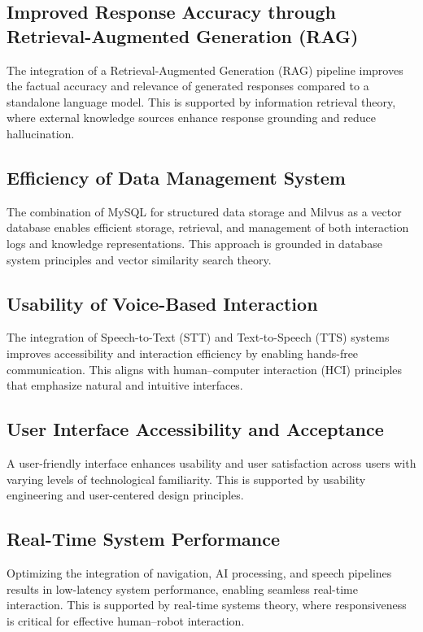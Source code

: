 \subsection{Improved Response Accuracy through Retrieval-Augmented Generation (RAG)} 
The integration of a Retrieval-Augmented Generation (RAG) pipeline improves the factual accuracy and relevance of generated responses compared to a standalone language model. This is supported by information retrieval theory, where external knowledge sources enhance response grounding and reduce hallucination.

\subsection{Efficiency of Data Management System}
The combination of MySQL for structured data storage and Milvus as a vector database enables efficient storage, retrieval, and management of both interaction logs and knowledge representations. This approach is grounded in database system principles and vector similarity search theory.

\subsection{Usability of Voice-Based Interaction}
The integration of Speech-to-Text (STT) and Text-to-Speech (TTS) systems improves accessibility and interaction efficiency by enabling hands-free communication. This aligns with human–computer interaction (HCI) principles that emphasize natural and intuitive interfaces.

\subsection{User Interface Accessibility and Acceptance}
A user-friendly interface enhances usability and user satisfaction across users with varying levels of technological familiarity. This is supported by usability engineering and user-centered design principles.

\subsection{Real-Time System Performance}
Optimizing the integration of navigation, AI processing, and speech pipelines results in low-latency system performance, enabling seamless real-time interaction. This is supported by real-time systems theory, where responsiveness is critical for effective human–robot interaction.

